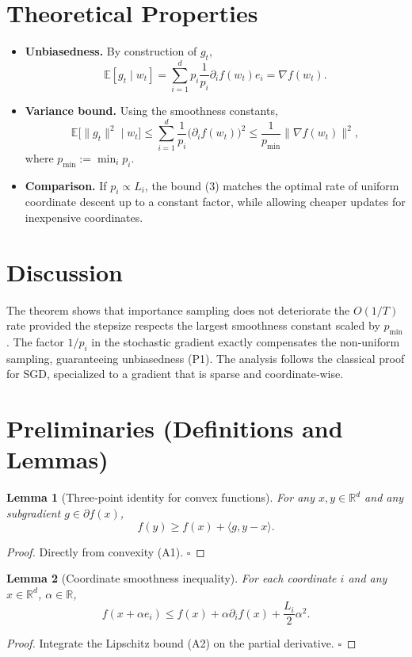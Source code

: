 \documentclass{article}
\newcommand{\E}{\mathbb{E}}
\newcommand{\R}{\mathbb{R}}
\newcommand{\ip}[2]{\langle #1,#2\rangle}
\newtheorem{lemma}{Lemma}
\begin{document}
\section*{Theoretical Properties}
\begin{itemize}
\item \textbf{Unbiasedness.} By construction of $g_t$,
\[
\E[g_t\mid w_t]=\sum_{i=1}^dp_i\frac{1}{p_i}\partial_i f(w_t)e_i=\nabla f(w_t).
\tag{P1}
\]
\item \textbf{Variance bound.} Using the smoothness constants,
\[
\E\!\big[\|g_t\|^2\mid w_t\big]\le \sum_{i=1}^d\frac{1}{p_i}\big(\partial_i f(w_t)\big)^2
\le \frac{1}{p_{\min}}\|\nabla f(w_t)\|^2,
\tag{P2}
\]
where $p_{\min}:=\min_i p_i$.
\item \textbf{Comparison.} If $p_i\propto L_i$, the bound (3) matches the optimal rate of uniform coordinate descent up to a constant factor, while allowing cheaper updates for inexpensive coordinates.
\end{itemize}

\section*{Discussion}
The theorem shows that importance sampling does not deteriorate the $O(1/T)$ rate provided the stepsize respects the largest smoothness constant scaled by $p_{\min}$. The factor $1/p_i$ in the stochastic gradient exactly compensates the non‑uniform sampling, guaranteeing unbiasedness (P1). The analysis follows the classical proof for SGD, specialized to a gradient that is sparse and coordinate‑wise.

\newpage
\section*{Preliminaries (Definitions and Lemmas)}
\begin{lemma}[Three‑point identity for convex functions]\label{lem:three}
For any $x,y\in\R^{d}$ and any subgradient $g\in\partial f(x)$,
\[
f(y)\ge f(x)+\ip{g}{y-x}.
\tag{L1}
\]
\end{lemma}
\begin{proof}
Directly from convexity (A1). \hfill $\square$
\end{proof}

\begin{lemma}[Coordinate smoothness inequality]\label{lem:smooth}
For each coordinate $i$ and any $x\in\R^{d}$, $\alpha\in\R$,
\[
f(x+\alpha e_i)\le f(x)+\alpha\partial_i f(x)+\frac{L_i}{2}\alpha^2.
\tag{L2}
\]
\end{lemma}
\begin{proof}
Integrate the Lipschitz bound (A2) on the partial derivative. \hfill $\square$
\end{proof}
\end{document}

